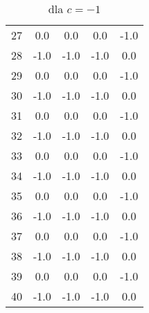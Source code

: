 \documentclass{article}
\begin{document}
\begin{center}
\begin{table}[h]
\begin{tabular}{|c|c|c|c|c|}
    27 & 0.0 & 0.0 & 0.0 & -1.0 \\
    28 & -1.0 & -1.0 & -1.0 & 0.0 \\
    29 & 0.0 & 0.0 & 0.0 & -1.0 \\
    30 & -1.0 & -1.0 & -1.0 & 0.0 \\
    31 & 0.0 & 0.0 & 0.0 & -1.0 \\
    32 & -1.0 & -1.0 & -1.0 & 0.0 \\
    33 & 0.0 & 0.0 & 0.0 & -1.0 \\
    34 & -1.0 & -1.0 & -1.0 & 0.0 \\
    35 & 0.0 & 0.0 & 0.0 & -1.0 \\
    36 & -1.0 & -1.0 & -1.0 & 0.0 \\
    37 & 0.0 & 0.0 & 0.0 & -1.0 \\
    38 & -1.0 & -1.0 & -1.0 & 0.0 \\
    39 & 0.0 & 0.0 & 0.0 & -1.0 \\
    40 & -1.0 & -1.0 & -1.0 & 0.0 \\
    \hline
    \end{tabular}
    \caption{dla $c=-1$}
    \end{table}

\end{center}
\end{document}
